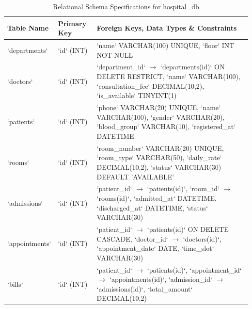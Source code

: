 \documentclass[12pt,a4paper]{article}
\begin{document}
\begin{table}[H]
\centering
\small
\caption{Relational Schema Specifications for hospital\_db}
\vspace{0.2cm}
\begin{tabularx}{\textwidth}{|l|l|p{8.5cm}|}
\hline
\textbf{Table Name} & \textbf{Primary Key} & \textbf{Foreign Keys, Data Types \& Constraints} \\
\hline
`departments` & `id` (INT) & `name` VARCHAR(100) UNIQUE, `floor` INT NOT NULL \\
\hline
`doctors` & `id` (INT) & `department_id` $\rightarrow$ `departments(id)` ON DELETE RESTRICT, `name` VARCHAR(100), `consultation_fee` DECIMAL(10,2), `is_available` TINYINT(1) \\
\hline
`patients` & `id` (INT) & `phone` VARCHAR(20) UNIQUE, `name` VARCHAR(100), `gender` VARCHAR(20), `blood_group` VARCHAR(10), `registered_at` DATETIME \\
\hline
`rooms` & `id` (INT) & `room_number` VARCHAR(20) UNIQUE, `room_type` VARCHAR(50), `daily_rate` DECIMAL(10,2), `status` VARCHAR(30) DEFAULT 'AVAILABLE' \\
\hline
`admissions` & `id` (INT) & `patient_id` $\rightarrow$ `patients(id)`, `room_id` $\rightarrow$ `rooms(id)`, `admitted_at` DATETIME, `discharged_at` DATETIME, `status` VARCHAR(30) \\
\hline
`appointments` & `id` (INT) & `patient_id` $\rightarrow$ `patients(id)` ON DELETE CASCADE, `doctor_id` $\rightarrow$ `doctors(id)`, `appointment_date` DATE, `time_slot` VARCHAR(30) \\
\hline
`bills` & `id` (INT) & `patient_id` $\rightarrow$ `patients(id)`, `appointment_id` $\rightarrow$ `appointments(id)`, `admission_id` $\rightarrow$ `admissions(id)`, `total_amount` DECIMAL(10,2) \\
\hline
\end{tabularx}
\end{table}
\end{document}
